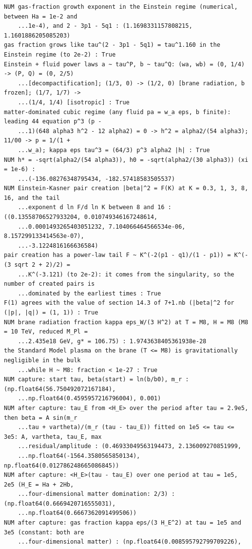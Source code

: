 \documentclass[10pt,a4paper]{article}
\begin{document}
\begin{Verbatim}[fontsize=\small,frame=single,framesep=2mm]
NUM gas-fraction growth exponent in the Einstein regime (numerical, between Ha = 1e-2 and
    ...1e-4), and 2 - 3p1 - 5q1 : (1.1698331157808215, 1.1601886205085203)
gas fraction grows like tau^(2 - 3p1 - 5q1) = tau^1.160 in the Einstein regime (to 2e-2) : True
Einstein + fluid power laws a ~ tau^P, b ~ tau^Q: (wa, wb) = (0, 1/4) -> (P, Q) = (0, 2/5)
    ...[decompactification]; (1/3, 0) -> (1/2, 0) [brane radiation, b frozen]; (1/7, 1/7) ->
    ...(1/4, 1/4) [isotropic] : True
matter-dominated cubic regime (any fluid pa = w_a eps, b finite): leading 44 equation p^3 (p -
    ...1)(648 alpha3 h^2 - 12 alpha2) = 0 -> h^2 = alpha2/(54 alpha3); 11/00 -> p = 1/(1 +
    ...w_a); kappa eps tau^3 = (64/3) p^3 alpha2 |h| : True
NUM h* = -sqrt(alpha2/(54 alpha3)), h0 = -sqrt(alpha2/(30 alpha3)) (xi = 1e-6) :
    ...(-136.08276348795434, -182.57418583505537)
NUM Einstein-Kasner pair creation |beta|^2 = F(K) at K = 0.3, 1, 3, 8, 16, and the tail
    ...exponent d ln F/d ln K between 8 and 16 : ((0.13558706527933204, 0.010749346167248614,
    ...0.0001493265403051232, 7.104066464566534e-06, 8.157299133414563e-07),
    ...-3.1224816166636584)
pair creation has a power-law tail F ~ K^(-2(p1 - q1)/(1 - p1)) = K^(-(3 sqrt 2 + 2)/2) =
    ...K^(-3.121) (to 2e-2): it comes from the singularity, so the number of created pairs is
    ...dominated by the earliest times : True
F(1) agrees with the value of section 14.3 of 7+1.nb (|beta|^2 for (|p|, |q|) = (1, 1)) : True
NUM brane radiation fraction kappa eps_W/(3 H^2) at T = M8, H = M8 (M8 = 10 TeV, reduced M_Pl =
    ...2.435e18 GeV, g* = 106.75) : 1.9743638405361938e-28
the Standard Model plasma on the brane (T <= M8) is gravitationally negligible in the bulk
    ...while H ~ M8: fraction < 1e-27 : True
NUM capture: start tau, beta(start) = ln(b/b0), m_r : (np.float64(56.750492072167184),
    ...np.float64(0.4595957216796004), 0.001)
NUM after capture: tau_E from <H_E> over the period after tau = 2.9e5, then beta = A sin(m_r
    ...tau + vartheta)/(m_r (tau - tau_E)) fitted on 1e5 <= tau <= 3e5: A, vartheta, tau_E, max
    ...residual/amplitude : (0.46933049563194473, 2.136009270851999,
    ...np.float64(-1564.3580565850134), np.float64(0.012786248665086845))
NUM after capture: <H_E>(tau - tau_E) over one period at tau = 1e5, 2e5 (H_E = Ha + 2Hb,
    ...four-dimensional matter domination: 2/3) : (np.float64(0.6669420716555031),
    ...np.float64(0.6667362091499506))
NUM after capture: gas fraction kappa eps/(3 H_E^2) at tau = 1e5 and 3e5 (constant: both are
    ...four-dimensional matter) : (np.float64(0.008595792799709226),

\end{Verbatim}
\end{document}

